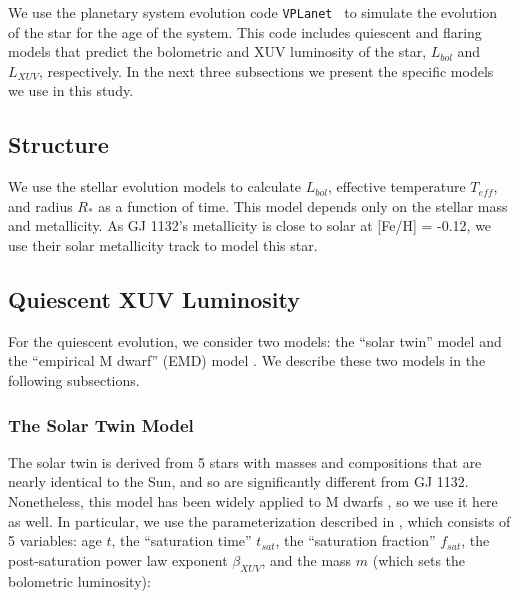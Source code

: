 \documentclass[preprint]{aastex631}
\newcommand{\link}[1]{{\small{\texttt{\underline{#1}}}}}
\def\eg{{\it e.g., }}
\def\vplanet{\texttt{\footnotesize{VPLanet}}\xspace}
\begin{document}
We use the planetary system evolution code \vplanet~\citep{Barnes20} to simulate the evolution of the star for the age of the system. This code includes quiescent and flaring models that predict the bolometric and XUV luminosity of the star, $L_{bol}$ and $L_{XUV}$, respectively. In the next three subsections we present the specific models we use in this study.


\subsection{Structure\label{sec:starstructure}}

We use the \cite{Baraffe15} stellar evolution models to calculate $L_{bol}$, effective temperature $T_{eff}$, and radius $R_*$ as a function of time. This model depends only on the stellar mass and metallicity. As GJ 1132's metallicity is close to solar at [Fe/H] = -0.12, we use their solar metallicity track to model this star.

\subsection{Quiescent XUV Luminosity\label{sec:quiescencemodel}}

For the quiescent evolution, we consider two models: the ``solar twin'' model \citep[][hereafter R05]{Ribas05} and the ``empirical M dwarf'' (EMD) model \citep[][]{EngleGuinan23,Engle24}. We describe these two models in the following subsections.

\subsubsection{The Solar Twin Model\label{sec:solartwin}} 

The solar twin  is derived from 5 stars with masses and compositions that are nearly identical to the Sun, and so are significantly different from GJ 1132. Nonetheless, this model has been widely applied to M dwarfs \citep[\eg][]{ZahnleCatling17,Mordasini20,EveOwen25,Fleming20}, so we use it here as well. In particular, we use the parameterization described in \cite{LugerBarnes15}, which consists of 5 variables: age $t$, the ``saturation time'' $t_{sat}$, the ``saturation fraction'' $f_{sat}$, the post-saturation power law exponent $\beta_{XUV}$, and the mass $m$ (which sets the bolometric luminosity): 
\end{document}
